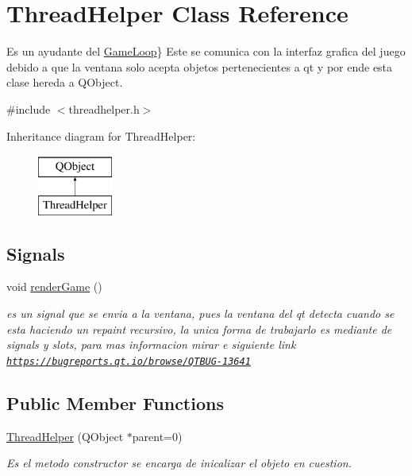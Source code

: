 \hypertarget{class_thread_helper}{\section{Thread\-Helper Class Reference}
\label{class_thread_helper}
}


Es un ayudante del \hyperlink{class_game_loop}{Game\-Loop}\} Este se comunica con la interfaz grafica del juego debido a que la ventana solo acepta objetos pertenecientes a qt y por ende esta clase hereda a Q\-Object.  




{\ttfamily \#include $<$threadhelper.\-h$>$}

Inheritance diagram for Thread\-Helper\-:\begin{figure}[H]
\begin{center}
\leavevmode
\includegraphics[height=2.000000cm]{class_thread_helper}
\end{center}
\end{figure}
\subsection*{Signals}
\begin{DoxyCompactItemize}
\item 
void \hyperlink{class_thread_helper_a2c3a5fdda82b0759fabc037088edd19c}{render\-Game} ()
\begin{DoxyCompactList}\small\item\em es un signal que se envia a la ventana, pues la ventana del qt detecta cuando se esta haciendo un repaint recursivo, la unica forma de trabajarlo es mediante de signals y slots, para mas informacion mirar e siguiente link \href{https://bugreports.qt.io/browse/QTBUG-13641}{\tt https\-://bugreports.\-qt.\-io/browse/\-Q\-T\-B\-U\-G-\/13641} \end{DoxyCompactList}\end{DoxyCompactItemize}
\subsection*{Public Member Functions}
\begin{DoxyCompactItemize}
\item 
\hyperlink{class_thread_helper_ae7f17139fdf7b9c32503651b77c60e5b}{Thread\-Helper} (Q\-Object $\ast$parent=0)
\begin{DoxyCompactList}\small\item\em Es el metodo constructor se encarga de inicalizar el objeto en cuestion. \end{DoxyCompactList}\end{DoxyCompactItemize}


